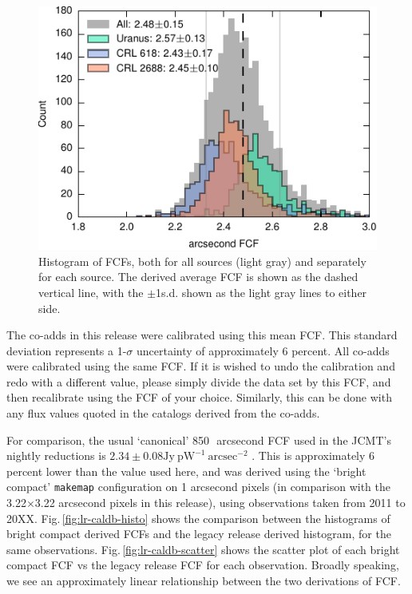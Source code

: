 \documentclass[twocolumn,times]{aastex6}
\begin{document}
\begin{figure}
  \centering
  \includegraphics{lrvalues-histo}
  \caption{Histogram of FCFs, both for all sources (light gray) and
    separately for each source. The derived average FCF is shown as
    the dashed vertical line, with the $\pm$1s.d. shown as the light
    gray lines to either side.}
  \label{fig:calibhist}
\end{figure}

The co-adds in this release were calibrated using this mean FCF.  This
standard deviation represents a 1-$\sigma$ uncertainty of
approximately 6 percent. All co-adds were calibrated using the same
FCF. If it is wished to undo the calibration and redo with a different
value, please simply divide the data set by this FCF, and then
recalibrate using the FCF of your choice. Similarly, this can be done
with any flux values quoted in the catalogs derived from the
co-adds.%

For comparison, the usual `canonical' 850\,\micron\ arcsecond FCF used
in the JCMT's nightly reductions is $2.34 \pm 0.08 \mathrm{Jy}\
\mathrm{pW}^{-1}\ \mathrm{arcsec}^{-2}$ \citep{Dempsey2013}. This is
approximately 6 percent lower than the value used here, and was
derived using the `bright compact' \texttt{makemap} configuration on 1
arcsecond pixels (in comparison with the 3.22$\times$3.22 arcsecond
pixels in this release), using observations taken from 2011 to
20XX. Fig.\,\ref{fig:lr-caldb-histo} shows the comparison between the
histograms of bright compact derived FCFs and the legacy release
derived histogram, for the same
observations. Fig.\,\ref{fig:lr-caldb-scatter} shows the scatter plot
of each bright compact FCF vs the legacy release FCF for each
observation. Broadly speaking, we see an approximately linear
relationship between the two derivations of FCF.
\end{document}
